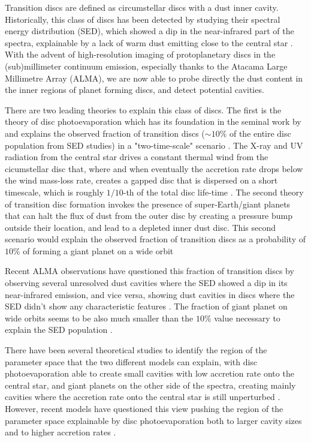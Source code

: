 \documentclass[fleqn,usenatbib]{mnras}
\begin{document}
Transition discs are defined as circumstellar discs with a dust inner cavity. Historically, this class of discs has been detected by studying their spectral energy distribution (SED), which showed a dip in the near-infrared part of the spectra, explainable by a lack of warm dust emitting close to the central star \citep{Strom1989}. With the advent of high-resolution imaging of protoplanetary discs in the (sub)millimeter continuum emission, especially thanks to the Atacama Large Millimetre Array (ALMA), we are now able to probe directly the dust content in the inner regions of planet forming discs, and detect potential cavities.

There are two leading theories to explain this class of discs.
The first is the theory of disc photoevaporation which has its foundation in the seminal work by \cite{Hollenbach1994} and explains the observed fraction of transition discs ($\sim 10\%$ of the entire disc population from SED studies) in a "two-time-scale" scenario \citep{Clarke2001}. The X-ray and UV radiation from the central star drives a constant thermal wind from the cicumstellar disc that, where and when eventually the accretion rate drops below the wind mass-loss rate, creates a gapped disc that is dispersed on a short timescale, which is roughly $1/10$-th of the total disc life-time \citep{Alexander2014,Ercolano2017}.
The second theory of transition disc formation invokes the presence of super-Earth/giant planets that can halt the flux of dust from the outer disc by creating a pressure bump outside their location, and lead to a depleted inner dust disc. This second scenario would explain the observed fraction of transition discs as a probability of $10\%$ of forming a giant planet on a wide orbit \citep{Duffell2015,Dong2016}

Recent ALMA observations have questioned this fraction of transition discs by observing several unresolved dust cavities where the SED showed a dip in its near-infrared emission, and vice versa, showing dust cavities in discs where the SED didn't show any characteristic features \citep{Andrews2018,Kurtovic2021,vanderMarel2022}.
The fraction of giant planet on wide orbits seems to be also much smaller than the $10 \%$ value necessary to explain the SED population \citep{Nielsen2019,Vigan2021}.

There have been several theoretical studies to identify the region of the parameter space that the two different models can explain, with disc photoevaporation able to create small cavities with low accretion rate onto the central star, and giant planets on the other side of the spectra, creating mainly cavities where the accretion rate onto the central star is still unperturbed \citep{Ercolano2017}.
However, recent models have questioned this view pushing the region of the parameter space explainable by disc photoevaporation both to larger cavity sizes and to higher accretion rates \citep{Picogna2019,Ercolano2018,Garate2021}.
\end{document}
